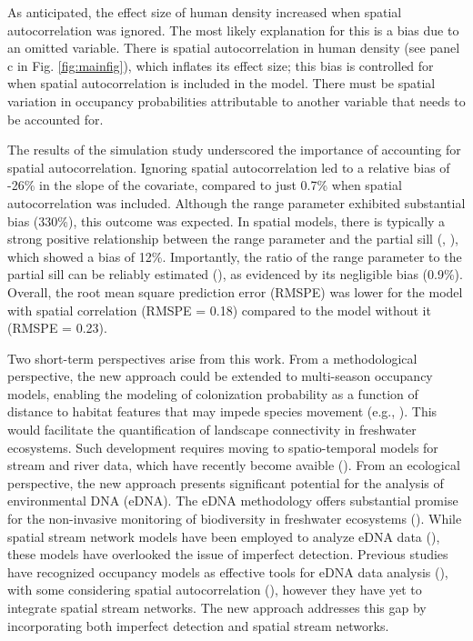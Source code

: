 \documentclass[
  11pt,
  a4paper,
]{article}
\begin{document}
As anticipated, the effect size of human density increased when spatial autocorrelation was ignored. The most likely explanation for this is a bias due to an omitted variable. There is spatial autocorrelation in human density (see panel c in Fig. \ref{fig:mainfig}), which inflates its effect size; this bias is controlled for when spatial autocorrelation is included in the model. There must be spatial variation in occupancy probabilities attributable to another variable that needs to be accounted for.

The results of the simulation study underscored the importance of accounting for spatial autocorrelation. Ignoring spatial autocorrelation led to a relative bias of -26\% in the slope of the covariate, compared to just 0.7\% when spatial autocorrelation was included. Although the range parameter exhibited substantial bias (330\%), this outcome was expected. In spatial models, there is typically a strong positive relationship between the range parameter and the partial sill (, ), which showed a bias of 12\%. Importantly, the ratio of the range parameter to the partial sill can be reliably estimated (), as evidenced by its negligible bias (0.9\%). Overall, the root mean square prediction error (RMSPE) was lower for the model with spatial correlation (RMSPE = 0.18) compared to the model without it (RMSPE = 0.23).

Two short-term perspectives arise from this work. From a methodological perspective, the new approach could be extended to multi-season occupancy models, enabling the modeling of colonization probability as a function of distance to habitat features that may impede species movement (e.g., ). This would facilitate the quantification of landscape connectivity in freshwater ecosystems. Such development requires moving to spatio-temporal models for stream and river data, which have recently become avaible (). From an ecological perspective, the new approach presents significant potential for the analysis of environmental DNA (eDNA). The eDNA methodology offers substantial promise for the non-invasive monitoring of biodiversity in freshwater ecosystems (). While spatial stream network models have been employed to analyze eDNA data (), these models have overlooked the issue of imperfect detection. Previous studies have recognized occupancy models as effective tools for eDNA data analysis (), with some considering spatial autocorrelation (), however they have yet to integrate spatial stream networks. The new approach addresses this gap by incorporating both imperfect detection and spatial stream networks.
\end{document}

